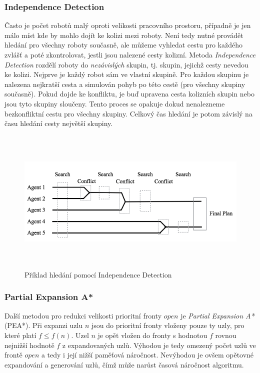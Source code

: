 \subsubsection{Independence Detection}
Často je počet robotů malý oproti velikosti pracovního prostoru, případně je jen málo míst kde by mohlo dojít ke kolizi mezi roboty. Není tedy nutné provádět hledání pro všechny roboty současně, ale můžeme vyhledat cestu pro každého zvlášť a poté zkontrolovat, jestli jsou nalezené cesty kolizní. Metoda \emph{Independence Detection} rozdělí roboty do \emph{nezávislých} skupin, tj. skupin, jejichž cesty nevedou ke kolizi. Nejprve je každý robot sám ve vlastní skupině. Pro každou skupinu je nalezena nejkratší cesta a simulován pohyb po této cestě (pro všechny skupiny současně). Pokud dojde ke konfliktu, je buď upravena cesta kolizních skupin nebo jsou tyto skupiny sloučeny. Tento proces se opakuje dokud nenalezneme bezkonfliktní cestu pro všechny skupiny. Celkový čas hledání je potom závislý na času hledání cesty největší skupiny. 

\begin{figure}[h!]
	\begin{center}
		\includegraphics*[width=15cm,height=7cm,keepaspectratio]{obr/independenceDetection}
	\end{center}
	\caption{Příklad hledání pomocí Independence Detection \cite{Kraft2017}}
	\label{obr:independenceDetection}
\end{figure}

\subsubsection{Partial Expansion A*}
Další metodou pro redukci velikosti prioritní fronty $open$ je \emph{Partial Expansion A*} (PEA*). Při expanzi uzlu $n$ jsou do prioritní fronty vloženy pouze ty uzly, pro které platí $f\leq f(n)$. Uzel $n$ je opět vložen do fronty s hodnotou $f$ rovnou nejnižší hodnotě $f$ z expandovaných uzlů. Výhodou je tedy omezený počet uzlů ve frontě $open$ a tedy i její nižší paměťová náročnost. Nevýhodou je ovšem opětovné expandování a generování uzlů, čímž může narůst časová náročnost algoritmu.

